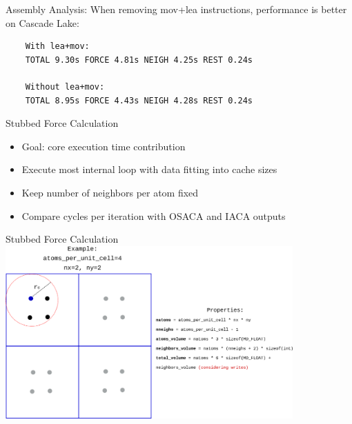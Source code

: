 \documentclass[aspectratio=169,t]{beamer}
\begin{document}
  \begin{frame}[fragile]{Assembly Analysis:}
    When removing mov+lea instructions, performance is better on Cascade Lake:
    \begin{verbatim}
    With lea+mov:
    TOTAL 9.30s FORCE 4.81s NEIGH 4.25s REST 0.24s

    Without lea+mov:
    TOTAL 8.95s FORCE 4.43s NEIGH 4.28s REST 0.24s
    \end{verbatim}
  \end{frame}

  \begin{frame}[fragile]{Stubbed Force Calculation}
    \begin{itemize}
      \item Goal: core execution time contribution
      \item Execute most internal loop with data fitting into cache sizes
      \item Keep number of neighbors per atom fixed
      \item Compare cycles per iteration with OSACA and IACA outputs
    \end{itemize}
  \end{frame}

  \begin{frame}{Stubbed Force Calculation}
  \centering
    \includegraphics[width=11cm]{stubbed_force_mdbench.png}
  \end{frame}
\end{document}
